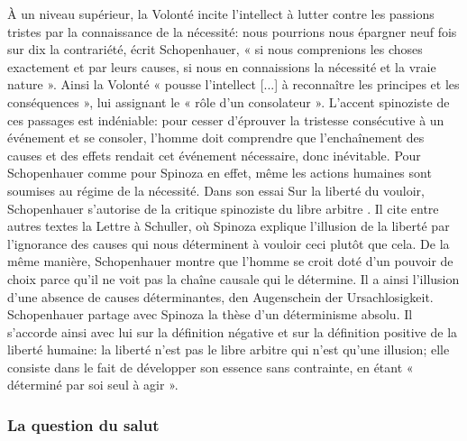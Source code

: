 À un niveau supérieur, la Volonté incite l’intellect à lutter contre les passions tristes par la connaissance de
la nécessité: nous pourrions nous épargner neuf fois sur dix la contrariété, écrit Schopenhauer, « si nous
comprenions les choses exactement et par leurs causes, si nous en connaissions la nécessité et la vraie
nature ». Ainsi la Volonté « pousse l’intellect [...] à reconnaître les principes et les
conséquences », lui assignant le « rôle d’un consolateur ». L’accent spinoziste de
ces passages est indéniable: pour cesser d’éprouver la tristesse consécutive à un événement et se consoler,
l’homme doit comprendre que l’enchaînement des causes et des effets rendait cet événement nécessaire,
donc inévitable.
Pour Schopenhauer comme pour Spinoza en effet, même les actions humaines sont soumises au régime de
la nécessité. Dans son essai Sur la liberté du vouloir, Schopenhauer s’autorise de la critique spinoziste du
libre arbitre . Il cite entre autres textes la Lettre  à Schuller, où Spinoza explique
l’illusion de la liberté par l’ignorance des causes qui nous déterminent à vouloir ceci plutôt que cela. De la
même manière, Schopenhauer montre que l’homme se croit doté d’un pouvoir de choix parce qu’il ne voit
pas la chaîne causale qui le détermine. Il a ainsi l’illusion d’une absence de causes déterminantes, den
Augenschein der Ursachlosigkeit. Schopenhauer partage avec Spinoza la thèse d’un
déterminisme absolu. Il s’accorde ainsi avec lui sur la définition négative et sur la définition positive de la
liberté humaine: la liberté n’est pas le libre arbitre qui n’est qu’une illusion; elle consiste dans le fait de
développer son essence sans contrainte, en étant « déterminé par soi seul à agir ».

\subsubsection{La question du salut}

